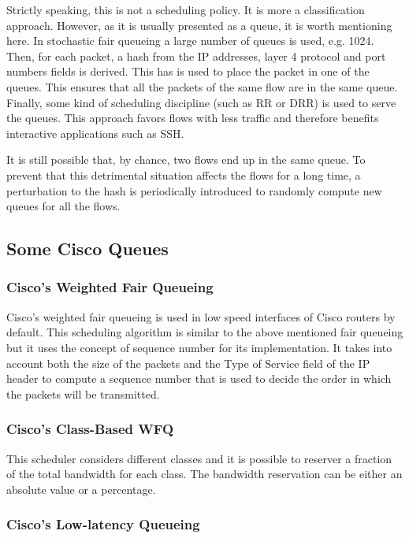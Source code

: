 Strictly speaking, this is not a scheduling policy.
It is more a classification approach.
However, as it is usually presented as a queue, it is worth mentioning here.
In stochastic fair queueing a large number of queues is used, e.g. 1024.
Then, for each packet, a hash from the IP addresses, layer 4 protocol and port numbers fields is derived. 
This has is used to place the packet in one of the queues.
This ensures that all the packets of the same flow are in the same queue.
Finally, some kind of scheduling discipline (such as RR or DRR) is used to serve the queues.
This approach favors flows with less traffic and therefore benefits interactive applications such as SSH.

It is still possible that, by chance, two flows end up in the same queue. 
To prevent that this detrimental situation affects the flows for a long time, a perturbation to the hash is periodically introduced to randomly compute new queues for all the flows.

\subsection{Some Cisco Queues}

\subsubsection{Cisco's Weighted Fair Queueing}

Cisco's weighted fair queueing is used in low speed interfaces of Cisco routers by default.
This scheduling algorithm is similar to the above mentioned fair queueing but it uses the concept of sequence number for its implementation.
It takes into account both the size of the packets and the Type of Service field of the IP header to compute a sequence number that is used to decide the order in which the packets will be transmitted.

\subsubsection{Cisco's Class-Based WFQ}

This scheduler considers different classes and it is possible to reserver a fraction of the total bandwidth for each class.
The bandwidth reservation can be either an absolute value or a percentage.

\subsubsection{Cisco's Low-latency Queueing}

